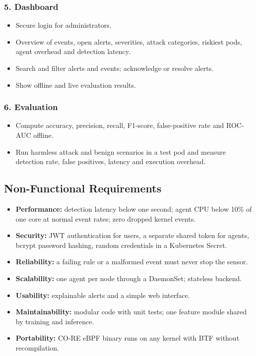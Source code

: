 \subsubsection*{5. Dashboard}
\begin{itemize}
    \item Secure login for administrators.
    \item Overview of events, open alerts, severities, attack categories, riskiest pods,
          agent overhead and detection latency.
    \item Search and filter alerts and events; acknowledge or resolve alerts.
    \item Show offline and live evaluation results.
\end{itemize}

\subsubsection*{6. Evaluation}
\begin{itemize}
    \item Compute accuracy, precision, recall, F1-score, false-positive rate and ROC-AUC
          offline.
    \item Run harmless attack and benign scenarios in a test pod and measure detection
          rate, false positives, latency and execution overhead.
\end{itemize}

\subsection{Non-Functional Requirements}
\begin{itemize}
    \item \textbf{Performance:} detection latency below one second; agent CPU below 10\%
          of one core at normal event rates; zero dropped kernel events.
    \item \textbf{Security:} JWT authentication for users, a separate shared token for
          agents, bcrypt password hashing, random credentials in a Kubernetes Secret.
    \item \textbf{Reliability:} a failing rule or a malformed event must never stop the
          sensor.
    \item \textbf{Scalability:} one agent per node through a DaemonSet; stateless backend.
    \item \textbf{Usability:} explainable alerts and a simple web interface.
    \item \textbf{Maintainability:} modular code with unit tests; one feature module shared
          by training and inference.
    \item \textbf{Portability:} CO-RE eBPF binary runs on any kernel with BTF without
          recompilation.
\end{itemize}

